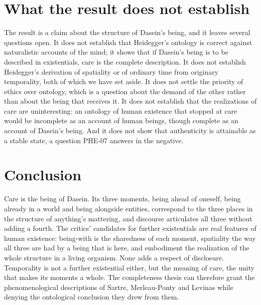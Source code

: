 \documentclass{situationist-preprint}
\begin{document}
\section{What the result does not establish}\label{s:not}

The result is a claim about the structure of Dasein's being, and it leaves several questions open. It does not establish that Heidegger's ontology is correct against naturalistic accounts of the mind; it shows that if Dasein's being is to be described in existentials, care is the complete description. It does not establish Heidegger's derivation of spatiality or of ordinary time from originary temporality, both of which we have set aside. It does not settle the priority of ethics over ontology, which is a question about the demand of the other rather than about the being that receives it. It does not establish that the realizations of care are uninteresting: an ontology of human existence that stopped at care would be incomplete as an account of human beings, though complete as an account of Dasein's being. And it does not show that authenticity is attainable as a stable state, a question PHE-07 answers in the negative.

\section{Conclusion}

Care is the being of Dasein. Its three moments, being ahead of oneself, being already in a world and being alongside entities, correspond to the three places in the structure of anything's mattering, and discourse articulates all three without adding a fourth. The critics' candidates for further existentials are real features of human existence: being-with is the sharedness of each moment, spatiality the way all three are had by a being that is here, and embodiment the realization of the whole structure in a living organism. None adds a respect of disclosure. Temporality is not a further existential either, but the meaning of care, the unity that makes its moments a whole. The completeness thesis can therefore grant the phenomenological descriptions of Sartre, Merleau-Ponty and Levinas while denying the ontological conclusion they drew from them.
\end{document}
